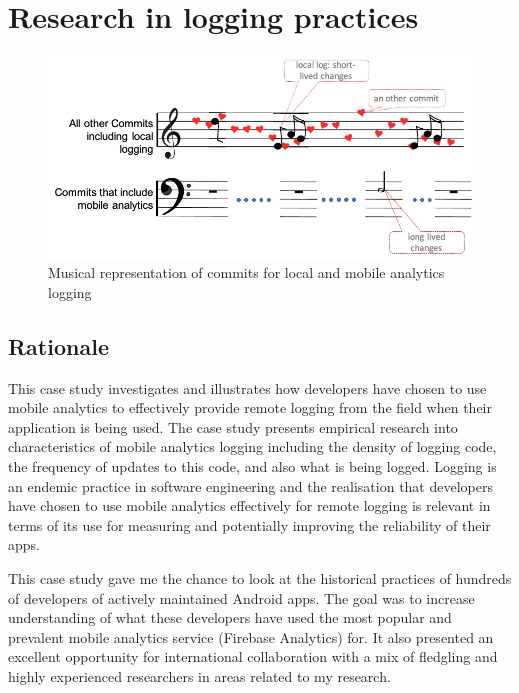 \section{Research in logging practices}
\label{section-research-in-logging-practices}

\begin{figure}
    \centering
    \includegraphics[width=15cm]{images/mobile-analytics-logging/musical-illustration.jpg}
    \caption{Musical representation of commits for local and mobile analytics logging}
    \label{fig:mobile_analytics_logging_musical_illustration}
\end{figure}

\subsection*{Rationale}

This case study investigates and illustrates how developers have chosen to use mobile analytics to effectively provide remote logging from the field when their application is being used. The case study presents empirical research into characteristics of mobile analytics logging including the density of logging code, the frequency of updates to this code, and also what is being logged. Logging is an endemic practice in software engineering and the realisation that developers have chosen to use mobile analytics effectively for remote logging is relevant in terms of its use for measuring and potentially improving the reliability of their apps.

This case study gave me the chance to look at the historical practices of hundreds of developers of actively maintained Android apps. The goal was to increase understanding of what these developers have used the most popular and prevalent mobile analytics service (Firebase Analytics) for. It also presented an excellent opportunity for international collaboration with a mix of fledgling and highly experienced researchers in areas related to my research.

